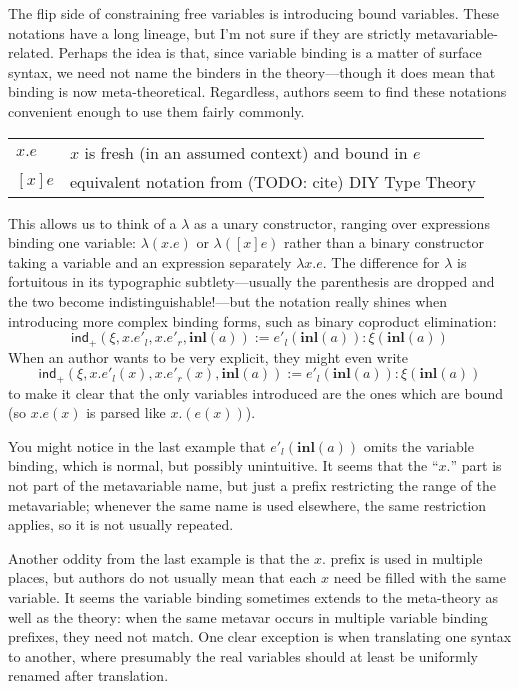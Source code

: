 \documentclass[11pt]{article} %
\theoremstyle{definition}
\theoremstyle{remark}
\begin{document}
The flip side of constraining free variables is introducing bound variables.
These notations have a long lineage, but I'm not sure if they are strictly metavariable-related.
Perhaps the idea is that, since variable binding is a matter of surface syntax, we need not name the binders in the theory---though it does mean that binding is now meta-theoretical.
Regardless, authors seem to find these notations convenient enough to use them fairly commonly.
\begin{center}
\renewcommand{\arraystretch}{1.2}
\begin{tabular}{lp{10cm}}
$x.e$ & $x$ is fresh (in an assumed context) and bound in $e$ \\
$[x]e$ & equivalent notation from (TODO: cite) DIY Type Theory \\
\end{tabular}
\end{center}
This allows us to think of a $\lambda$ as a unary constructor, ranging over expressions binding one variable: $\lambda(x.e)$ or $\lambda([x]e)$ rather than a binary constructor taking a variable and an expression separately $\lambda x.e$.
The difference for $\lambda$ is fortuitous in its typographic subtlety---usually the parenthesis are dropped and the two become indistinguishable!---but the notation really shines when introducing more complex binding forms, such as binary coproduct elimination:
  $$\mathsf{ind}_+(\xi, x.e'_l, x.e'_r, \mathbf{inl}(a)) \mathbin{:=} e'_l(\mathbf{inl}(a)) : \xi(\mathbf{inl}(a))$$
When an author wants to be very explicit, they might even write
  $$\mathsf{ind}_+(\xi, x.e'_l(x), x.e'_r(x), \mathbf{inl}(a)) \mathbin{:=} e'_l(\mathbf{inl}(a)) : \xi(\mathbf{inl}(a))$$
to make it clear that the only variables introduced are the ones which are bound (so $x.e(x)$ is parsed like $x.(e(x))$).

You might notice in the last example that $e'_l(\mathbf{inl}(a))$ omits the variable binding, which is normal, but possibly unintuitive.
It seems that the ``$x.$'' part is not part of the metavariable name, but just a prefix restricting the range of the metavariable; whenever the same name is used elsewhere, the same restriction applies, so it is not usually repeated.

Another oddity from the last example is that the $x.$ prefix is used in multiple places, but authors do not usually mean that each $x$ need be filled with the same variable.
It seems the variable binding sometimes extends to the meta-theory as well as the theory: when the same metavar occurs in multiple variable binding prefixes, they need not match.
One clear exception is when translating one syntax to another, where presumably the real variables should at least be uniformly renamed after translation.
\end{document}

